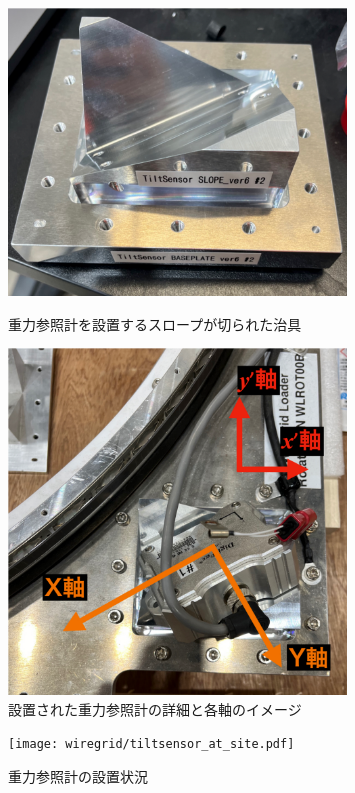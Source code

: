 \documentclass[../../main.tex]{subfiles}
\begin{document}
\begin{figure}[H]
    \begin{minipage}[b]{0.55\columnwidth}
        \centering
        \includegraphics[width=0.8\textwidth]{wiregrid/tiltsensor_slope.pdf}
        \caption{重力参照計を設置するスロープが切られた治具}
        \label{fig:tiltsensor_slope}
    \end{minipage}
    \hfill
    \begin{minipage}[b]{0.46\columnwidth}
        \centering
        \includegraphics[width=0.8\textwidth]{wiregrid/tiltsensor_WGplane.pdf}
        \caption{設置された重力参照計の詳細と各軸のイメージ}
        \label{fig:tiltsensor_WGplane}
    \end{minipage}
    \label{fig:abs_angle_slope}
\end{figure}
\begin{figure}[H]
    \centering
    \texttt{[image: wiregrid/tiltsensor\_at\_site.pdf]}
    \caption{重力参照計の設置状況}
    \label{fig:tiltsensor_at_site}
\end{figure}
\end{document}

